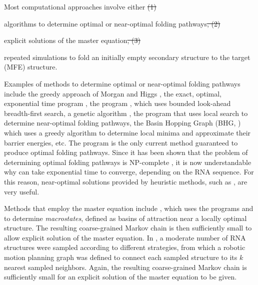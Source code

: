 \documentclass[11pt, oneside]{Thesis} %
\providecommand{\DIFadd}[1]{{\protect\color{blue}\uwave{#1}}} %
\providecommand{\DIFdel}[1]{{\protect\color{red}\sout{#1}}}                      %
\providecommand{\DIFaddbegin}{} %
\providecommand{\DIFaddend}{} %
\providecommand{\DIFdelbegin}{} %
\providecommand{\DIFdelend}{} %
\begin{document}
Most computational approaches involve either
\DIFdelbegin \DIFdel{(1) }\DIFdelend \DIFaddbegin \begin{inparaenum}[\em 1\upshape)]
\item \DIFaddend algorithms to determine optimal or near-optimal folding pathways\DIFdelbegin \DIFdel{, (2) }\DIFdelend \DIFaddbegin \DIFadd{;
}\item \DIFaddend explicit solutions of the master equation\DIFdelbegin \DIFdel{, (3) }\DIFdelend \DIFaddbegin \DIFadd{; or
}\item \DIFaddend repeated simulations to fold an initially empty secondary structure to
the target \mfe (MFE) structure.
\DIFaddbegin \end{inparaenum}
\DIFaddend Examples of methods to determine optimal or
near-optimal folding pathways include the greedy approach of Morgan
and Higgs \citep{morganhiggsbarrier}, the exact, optimal, exponential
time program \barriers \citep{flammhofacker}, the program
 \citep{flamm.r01}, which uses bounded look-ahead
breadth-first search, a genetic algorithm \citep{shapiro.jmb01}, the
program  that uses local search to determine
near-optimal folding pathways, the Basin Hopping Graph
(BHG, \citep{kucharik:2014ft}) which uses a greedy algorithm to determine local minima
and approximate their barrier energies, etc. The program \barriers
\citep{flammhofacker} is the only current method guaranteed to
produce optimal folding pathways. Since it has been shown that
the problem of determining optimal folding pathways is
NP-complete \citep{thachuk.psb10}, it is now understandable why
 can take exponential time to converge, depending
on the RNA sequence. For this reason, near-optimal solutions
provided by heuristic methods, such as , are very useful.

Methods that employ the master equation include 
\citep{wolfingerstadler:kinetics}, which uses the programs
 \citep{wuchtyfontanahofackerschuster} and \barriers
\citep{flammhofacker} to determine {\em macrostates}, defined as basins
of attraction near a locally optimal structure. The resulting
coarse-grained Markov chain is then sufficiently small to allow explicit
solution of the master equation. In \citep{tang.jcb05}, a moderate
number of RNA structures were sampled according to different
strategies, from which a robotic motion planning graph was defined
to connect each sampled structure to its $k$ nearest sampled
neighbors. Again, the resulting coarse-grained Markov chain is
sufficiently small for an explicit solution of the master equation to
be given.
\end{document}
